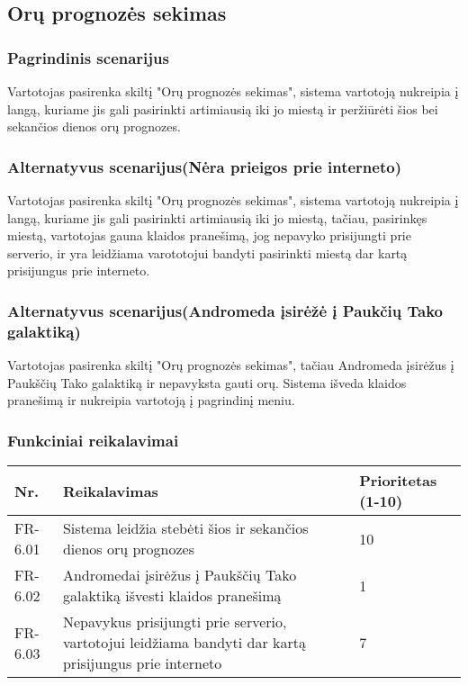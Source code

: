 \documentclass[oneside]{VUMIFPSkursinis}
\begin{document}
\subsection{Orų prognozės sekimas}
\subsubsection{Pagrindinis scenarijus}
	Vartotojas pasirenka skiltį "Orų prognozės sekimas", sistema vartotoją nukreipia į langą, kuriame jis gali pasirinkti artimiausią iki jo miestą ir peržiūrėti šios bei sekančios dienos orų prognozes.
\subsubsection{Alternatyvus scenarijus(Nėra prieigos prie interneto)}
	Vartotojas pasirenka skiltį "Orų prognozės sekimas", sistema vartotoją nukreipia į langą, kuriame jis gali pasirinkti artimiausią iki jo miestą, tačiau, pasirinkęs miestą, vartotojas gauna klaidos pranešimą, jog nepavyko prisijungti prie serverio, ir yra leidžiama varototojui bandyti pasirinkti miestą dar kartą prisijungus prie interneto.
\subsubsection{Alternatyvus scenarijus(Andromeda įsirėžė į Paukčių Tako galaktiką)}
	Vartotojas pasirenka skiltį "Orų prognozės sekimas", tačiau Andromeda įsirėžus į Paukščių Tako galaktiką ir nepavyksta gauti orų. Sistema išveda klaidos pranešimą ir nukreipia vartotoją į pagrindinį meniu.
\subsubsection{Funkciniai reikalavimai}
\begin{table}[htbp]
	\begin{tabularx}{1\textwidth}{ |P{2.5cm}|X|P{3cm }| }  \hline
      Nr. & Reikalavimas & Prioritetas (1-10)  \\   \hline 
      FR-6.01 & Sistema leidžia stebėti šios ir sekančios dienos orų prognozes & 10  \\   \hline
			FR-6.02 & Andromedai įsirėžus į Paukščių Tako galaktiką išvesti klaidos pranešimą & 1 \\  \hline
			FR-6.03 & Nepavykus prisijungti prie serverio, vartotojui leidžiama bandyti dar kartą prisijungus prie interneto & 7 \\ \hline
	\end{tabularx}
\end{table}
\end{document}
